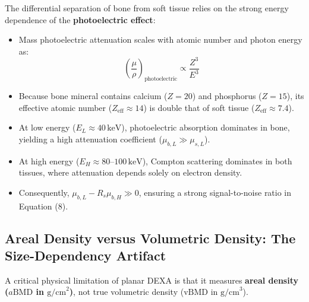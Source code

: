 \documentclass[11pt,a4paper]{article}
\begin{document}
\begin{physicsbox}
The differential separation of bone from soft tissue relies on the strong energy dependence of the \textbf{photoelectric effect}:
\begin{itemize}[leftmargin=*]
    \item Mass photoelectric attenuation scales with atomic number and photon energy as:
    \begin{equation}
        \left( \frac{\mu}{\rho} \right)_{\text{photoelectric}} \propto \frac{Z^3}{E^3}
    \end{equation}
    \item Because bone mineral contains calcium ($Z = 20$) and phosphorus ($Z = 15$), its effective atomic number ($Z_{\text{eff}} \approx 14$) is double that of soft tissue ($Z_{\text{eff}} \approx 7.4$).
    \item At low energy ($E_L \approx 40\,\text{keV}$), photoelectric absorption dominates in bone, yielding a high attenuation coefficient ($\mu_{b,L} \gg \mu_{s,L}$).
    \item At high energy ($E_H \approx 80\text{--}100\,\text{keV}$), Compton scattering dominates in both tissues, where attenuation depends solely on electron density.
    \item Consequently, $\mu_{b,L} - R_s \mu_{b,H} \gg 0$, ensuring a strong signal-to-noise ratio in Equation (8).
\end{itemize}
\end{physicsbox}

\subsection{Areal Density versus Volumetric Density: The Size-Dependency Artifact}

A critical physical limitation of planar DEXA is that it measures \textbf{areal density ($a\text{BMD}$ in $\text{g/cm}^2$)}, not true volumetric density ($\text{vBMD}$ in $\text{g/cm}^3$).
\end{document}
